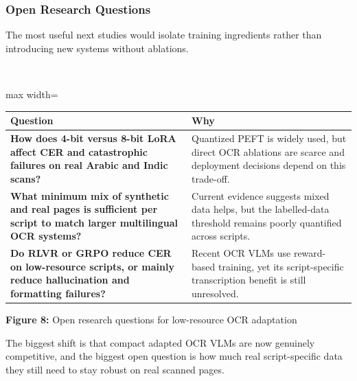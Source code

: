     
    \subsubsection*{Open Research Questions}
    
    
    The most useful next studies would isolate training ingredients rather than introducing new systems without ablations.
    
    
    \mbox{}\\
    \begin{adjustbox}{max width=\textwidth}
    \begin{tabular}{p{8.0cm} | p{8.0cm}}
    \hline
    Question & Why \\
    \hline
    \textbf{How does 4-bit versus 8-bit LoRA affect CER and catastrophic failures on real Arabic and Indic scans?} & Quantized PEFT is widely used, but direct OCR ablations are scarce and deployment decisions depend on this trade-off. \\
    \textbf{What minimum mix of synthetic and real pages is sufficient per script to match larger multilingual OCR systems?} & Current evidence suggests mixed data helps, but the labelled-data threshold remains poorly quantified across scripts. \\
    \textbf{Do RLVR or GRPO reduce CER on low-resource scripts, or mainly reduce hallucination and formatting failures?} & Recent OCR VLMs use reward-based training, yet its script-specific transcription benefit is still unresolved. \\
    \hline
    \end{tabular}
    \end{adjustbox}
    
    
    \textbf{Figure 8:} Open research questions for low-resource OCR adaptation
    
    
    The biggest shift is that compact adapted OCR VLMs are now genuinely competitive, and the biggest open question is how much real script-specific data they still need to stay robust on real scanned pages.
    
    
    
    
    